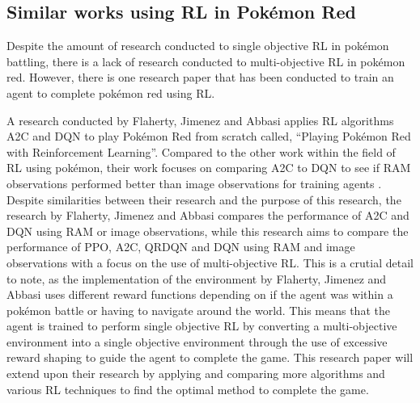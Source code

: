 \subsection{Similar works using RL in Pokémon Red}

Despite the amount of research conducted to single objective RL in pokémon battling, there is a lack of research conducted to multi-objective RL in pokémon red. However, there is one research paper that has been conducted to train an agent to complete pokémon red using RL.

A research conducted by Flaherty, Jimenez and Abbasi applies RL algorithms A2C and DQN to play Pokémon Red from scratch called, ``Playing Pokémon Red with Reinforcement Learning''\cite{flaherty2021playing}. Compared to the other work within the field of RL using pokémon, their work focuses on comparing A2C to DQN to see if RAM observations performed better than image observations for training agents \cite{flaherty2021playing}. Despite similarities between their research and the purpose of this research, the research by Flaherty, Jimenez and Abbasi compares the performance of A2C and DQN using RAM or image observations, while this research aims to compare the performance of PPO, A2C, QRDQN and DQN using RAM and image observations with a focus on the use of multi-objective RL. This is a crutial detail to note, as the implementation of the environment by Flaherty, Jimenez and Abbasi uses different reward functions depending on if the agent was within a pokémon battle or having to navigate around the world. This means that the agent is trained to perform single objective RL by converting a multi-objective environment into a single objective environment through the use of excessive reward shaping to guide the agent to complete the game. This research paper will extend upon their research by applying and comparing more algorithms and various RL techniques to find the optimal method to complete the game.

